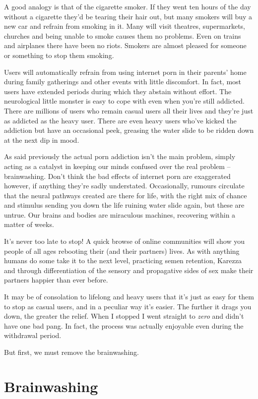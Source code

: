 \documentclass[
]{book}
\begin{document}
A good analogy is that of the cigarette smoker. If they went ten hours of the day without a cigarette they'd be tearing their hair out, but many smokers will buy a new car and refrain from smoking in it. Many will visit theatres, supermarkets, churches and being unable to smoke causes them no problems. Even on trains and airplanes there have been no riots. Smokers are almost pleased for someone or something to stop them smoking.

Users will automatically refrain from using internet porn in their parents' home during family gatherings and other events with little discomfort. In fact, most users have extended periods during which they abstain without effort. The neurological little monster is easy to cope with even when you're still addicted. There are millions of users who remain casual users all their lives and they're just as addicted as the heavy user. There are even heavy users who've kicked the addiction but have an occasional peek, greasing the water slide to be ridden down at the next dip in mood.

As said previously the actual porn addiction isn't the main problem, simply acting as a catalyst in keeping our minds confused over the real problem -- brainwashing. Don't think the bad effects of internet porn are exaggerated however, if anything they're sadly understated. Occasionally, rumours circulate that the neural pathways created are there for life, with the right mix of chance and stimulus sending you down the life ruining water slide again, but these are untrue. Our brains and bodies are miraculous machines, recovering within a matter of weeks.

It's never too late to stop! A quick browse of online communities will show you people of all ages rebooting their (and their partners) lives. As with anything humans do some take it to the next level, practicing semen retention, Karezza and through differentiation of the sensory and propagative sides of sex make their partners happier than ever before.

It may be of consolation to lifelong and heavy users that it's just as easy for them to stop as casual users, and in a peculiar way it's easier. The further it drags you down, the greater the relief. When I stopped I went straight to \emph{zero} and didn't have one bad pang. In fact, the process was actually enjoyable even during the withdrawal period.

But first, we must remove the brainwashing.

\hypertarget{brainwashing}{%
\chapter{Brainwashing}\label{brainwashing}}
\end{document}
